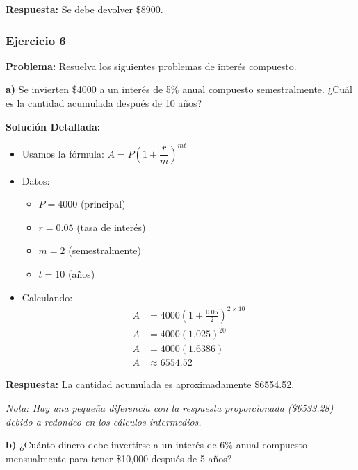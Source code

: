 \textbf{Respuesta:} Se debe devolver \$8900.

\hrulefill


\subsubsection*{Ejercicio 6}
\textbf{Problema:} Resuelva los siguientes problemas de interés compuesto.

\medskip

\textbf{a)} Se invierten \$4000 a un interés de 5\% anual compuesto semestralmente. ¿Cuál es la cantidad acumulada después de 10 años?

\textbf{Solución Detallada:}
\begin{itemize}
    \item Usamos la fórmula: $A = P\left(1 + \dfrac{r}{m}\right)^{mt}$
    \item Datos:
    \begin{itemize}
        \item $P = 4000$ (principal)
        \item $r = 0.05$ (tasa de interés)
        \item $m = 2$ (semestralmente)
        \item $t = 10$ (años)
    \end{itemize}
    \item Calculando:
    \begin{align*}
    A &= 4000\left(1 + \frac{0.05}{2}\right)^{2 \times 10} \\
    A &= 4000(1.025)^{20} \\
    A &= 4000(1.6386) \\
    A &\approx 6554.52
    \end{align*}
\end{itemize}

\textbf{Respuesta:} La cantidad acumulada es aproximadamente \$6554.52.

\textit{Nota: Hay una pequeña diferencia con la respuesta proporcionada (\$6533.28) debido a redondeo en los cálculos intermedios.}

\medskip

\textbf{b)} ¿Cuánto dinero debe invertirse a un interés de 6\% anual compuesto mensualmente para tener \$10,000 después de 5 años?

